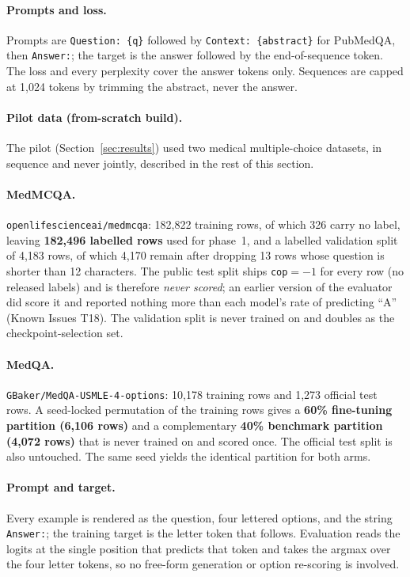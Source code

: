\documentclass[11pt,a4paper]{article}
\theoremstyle{plain}
\theoremstyle{definition}
\theoremstyle{remark}
\begin{document}
\paragraph{Prompts and loss.}
Prompts are \texttt{Question: \{q\}} followed by \texttt{Context: \{abstract\}}
for PubMedQA, then \texttt{Answer:}; the target is the answer followed by the
end-of-sequence token. The loss and every perplexity cover the answer tokens
only. Sequences are capped at 1{,}024 tokens by trimming the abstract, never
the answer.

\paragraph{Pilot data (from-scratch build).}
The pilot (Section~\ref{sec:results}) used two medical multiple-choice
datasets, in sequence and never jointly, described in the rest of this
section.

\paragraph{MedMCQA.}
\texttt{openlifescienceai/medmcqa}: 182{,}822 training rows, of which 326 carry
no label, leaving \textbf{182{,}496 labelled rows} used for phase~1, and a
labelled validation split of 4{,}183 rows, of which 4{,}170 remain after dropping 13 rows whose
question is shorter than 12 characters. The public test split ships
\texttt{cop}$=-1$ for every row (no released labels) and is therefore
\emph{never scored}; an earlier version of the evaluator did score it and
reported nothing more than each model's rate of predicting ``A''
(Known Issues T18). The validation split is never trained on and doubles as
the checkpoint-selection set.

\paragraph{MedQA.}
\texttt{GBaker/MedQA-USMLE-4-options}: 10{,}178 training rows and 1{,}273
official test rows. A seed-locked permutation of the training rows gives a
\textbf{60\% fine-tuning partition (6{,}106 rows)} and a complementary
\textbf{40\% benchmark partition (4{,}072 rows)} that is never trained on and
scored once. The official test split is also untouched. The same seed yields
the identical partition for both arms.

\paragraph{Prompt and target.}
Every example is rendered as the question, four lettered options, and the
string \texttt{Answer:}; the training target is the letter token that follows.
Evaluation reads the logits at the single position that predicts that token
and takes the argmax over the four letter tokens, so no free-form generation or
option re-scoring is involved.
\end{document}
